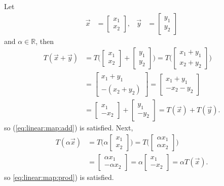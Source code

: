 \begin{example}
Let 
%
\begin{align*}
\vec{x} & = \begin{bmatrix}
x_1 \\ x_2 
\end{bmatrix}, & \vec{y} & = \begin{bmatrix}
y_1 \\ y_2 
\end{bmatrix}
\end{align*}
and $\alpha \in \mathbb{R}$, then 
%
\begin{align*}
T(\vec{x}+\vec{y}) & = T \biggl( \begin{bmatrix}
x_1 \\ x_2 
\end{bmatrix}+ \begin{bmatrix}
y_1 \\ y_2 
\end{bmatrix} \biggr) = T \biggl( \begin{bmatrix}
x_1 + y_1 \\ x_2 + y_2 
\end{bmatrix} \biggr) \\
& = \begin{bmatrix}
x_1 + y_1 \\ -(x_2+y_2) 
\end{bmatrix} = \begin{bmatrix}
x_1 + y_1 \\ -x_2 -y_2 
\end{bmatrix} \\
& = \begin{bmatrix}
x_1 \\ -x_2 
\end{bmatrix} + \begin{bmatrix}
y_1 \\ -y_2 
\end{bmatrix} = T(\vec{x}) + T(\vec{y}).  
\end{align*}
so (\ref{eq:linear:map:add}) is satisfied.  Next, 
%
\begin{align*}
T(\alpha \vec{x}) & = T \biggl( \alpha \begin{bmatrix}
x_1 \\ x_2
\end{bmatrix} \biggr) = T \biggl( \begin{bmatrix}
\alpha x_1 \\ \alpha x_2 
\end{bmatrix} \biggr) \\
& = \begin{bmatrix}
\alpha x_1 \\ -\alpha x_2 
\end{bmatrix} = \alpha \begin{bmatrix}
x_1 \\ -x_2 
\end{bmatrix} = \alpha T(\vec{x}).  
\end{align*}
so \ref{eq:linear:map:prod}) is satisfied.  
\end{example}

